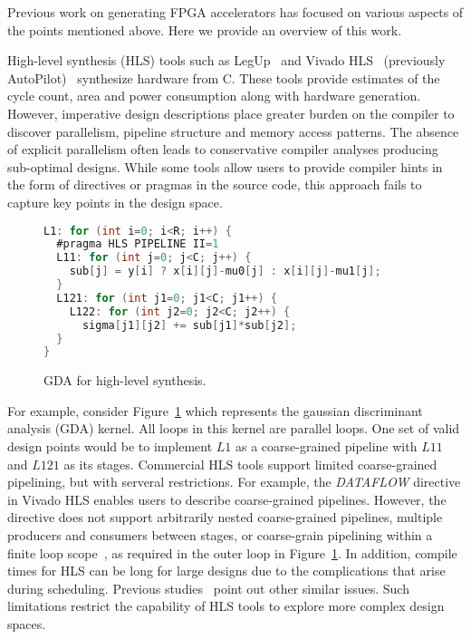 Previous work on generating FPGA accelerators has focused on various aspects of the points
mentioned above. Here we provide an overview of this work.

High-level synthesis (HLS) tools such as LegUp~\cite{legup-tecs} and Vivado HLS~\cite{vivadohls} (previously AutoPilot)~\cite{cong11hls}
synthesize hardware from C. These tools provide estimates of the cycle count, area and power consumption
along with hardware generation. However, imperative design descriptions place greater burden on
the compiler to discover parallelism, pipeline structure and memory access patterns.
The absence of explicit parallelism often leads to conservative compiler analyses
producing sub-optimal designs. While some tools allow users to provide compiler
hints in the form of directives or pragmas in the source code, this approach
fails to capture key points in the design space.
\begin{figure}[ht]
  \begin{lstlisting}[mathescape=true, numbers=none, language=C]
L1: for (int i=0; i<R; i++) {
  #pragma HLS PIPELINE II=1
  L11: for (int j=0; j<C; j++) {
    sub[j] = y[i] ? x[i][j]-mu0[j] : x[i][j]-mu1[j];
  }
  L121: for (int j1=0; j1<C; j1++) {
    L122: for (int j2=0; j2<C; j2++) {
      sigma[j1][j2] += sub[j1]*sub[j2];
  }
}
  \end{lstlisting}
  \caption{GDA for high-level synthesis.}
  \label{fig:gda-hls}
\end{figure}
For example, consider Figure~\ref{fig:gda-hls} which represents the gaussian discriminant analysis (GDA)
kernel. All loops in this kernel are parallel loops. One set of valid design points would be to implement $L1$
as a coarse-grained pipeline with $L11$ and $L121$ as its stages. Commercial HLS tools support
 limited coarse-grained pipelining, but with serveral restrictions. For example,
the \emph{DATAFLOW} directive in Vivado HLS enables users to describe coarse-grained pipelines.
However, the directive does not support arbitrarily nested coarse-grained pipelines,
multiple producers and consumers between stages, or coarse-grain pipelining within a finite loop scope~\cite{vivadohls_ug}, as required in the outer loop in Figure~\ref{fig:gda-hls}.
In addition, compile times for HLS can be long for large designs due to the complications that
arise during scheduling. %
Previous studies~\cite{Aladdin} point out other similar issues.
Such limitations restrict the capability of HLS tools to explore more complex design spaces.

